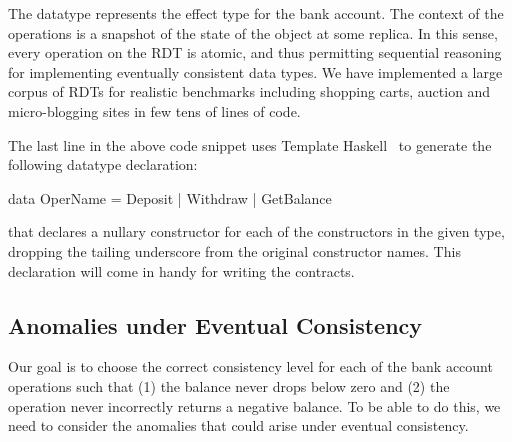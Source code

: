 
The datatype  represents the effect type for the bank account. The
context of the operations is a snapshot of the state of the object at some
replica. In this sense, every operation on the RDT is atomic, and thus
permitting sequential reasoning for implementing eventually consistent data
types. We have implemented a large corpus of RDTs for realistic benchmarks
including shopping carts, auction and micro-blogging sites in few tens of lines
of code.

The last line in the above code snippet uses Template Haskell~\cite{} to
generate the following datatype declaration:

\begin{codehaskell}
data OperName = Deposit | Withdraw | GetBalance
\end{codehaskell}

\noindent that declares a nullary constructor for each of the constructors in
the given type, dropping the tailing underscore from the original constructor
names. This declaration will come in handy for writing the contracts.

\subsection{Anomalies under Eventual Consistency}

Our goal is to choose the correct consistency level for each of the bank
account operations such that (1) the balance never drops below zero and (2) the
 operation never incorrectly returns a negative balance. To be
able to do this, we need to consider the anomalies that could arise under
eventual consistency.

